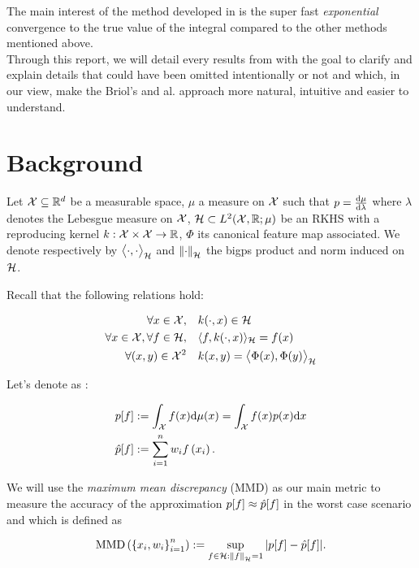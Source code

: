   The main interest of the method developed in \cite{FWBQ} is the super fast
  \textit{exponential} convergence to the true value of the integral compared to the other methods mentioned above.\\

  Through this report, we will detail every results from \cite{FWBQ} with the goal
  to clarify and explain details that could have been omitted intentionally or not and which, in our view, make the Briol's and al. approach more natural, intuitive and easier
  to understand.

\section{Background}
Let $\mathcal{X} \subseteq \mathbb{R} ^ { d }$ be a measurable space, $\mu$ a measure on $\mathcal{X}$ such
that $p = \frac{\mathop{}\mathopen{}\mathrm{d} \mu}{ \mathop{}\mathopen{}\mathrm{d} \lambda}$ where $\lambda$ denotes the Lebesgue measure on $\mathcal{X}$,
  $\mathcal{H} \subset L^2(\mathcal{X}, \mathbb{R}; \mu)$ be an RKHS with a
 reproducing kernel $k: \mathcal{X} \times \mathcal{X} \rightarrow \mathbb{R}$, $\Phi$ its canonical feature
 map associated. We denote respectively by $\bigl \langle \cdot , \cdot \bigr \rangle_{\mathcal{H}}$ and $\norme{\cdot}$
 the bigps product and norm induced on $\mathcal{H}$.

 Recall that the following relations hold:
 \begin{boxexercise}
   \begin{align}
  \forall x \in \mathcal{X} , \quad &k ( \cdot , x ) \in \mathcal{H}\\
  \forall x \in \mathcal{X} , \forall f \in \mathcal{H} , \quad &\langle f , k ( \cdot , x ) \rangle _ { \mathcal{H} } = f ( x )\\
  \forall (x,y) \in \mathcal{X}^2 \quad &k(x,y) = \bigl \langle \Phi(x) , \Phi(y) \bigr \rangle_{\mathcal{H}}
  \end{align}
\end{boxexercise}


Let's denote as \cite{FWBQ}:
\begin{boxdefinition}
  \begin{align*}
    p[f] &:= \int _ { \mathcal{X} } f ( x ) \mathrm { d } \mu(x) = \int _ { \mathcal{X} } f ( x ) p ( x ) \mathrm { d } x\\
    \hat{p}[f]&:=\sum _ { i = 1 } ^ { n } w _ { i } f \left( x _ { i } \right).
  \end{align*}
\end{boxdefinition}


We will use the \textit{maximum mean discrepancy} (MMD) as our main metric to measure
 the accuracy of the approximation $p[f] \approx \hat{p}[f]$ in the worst case scenario and which is defined as
 \begin{boxdefinition}
    $$\MMD : = \sup _ { f \in \H : \norme{f}=1 } | p [ f ] - \hat { p } [ f ] |.$$
 \end{boxdefinition}

